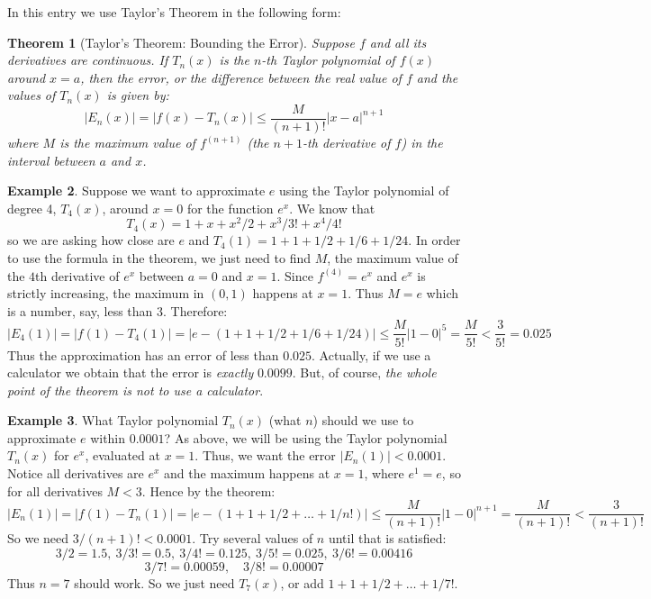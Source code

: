 \documentclass[12pt]{article}
\newtheorem{thm}{Theorem}
\theoremstyle{definition}
\newtheorem{exa}[thm]{Example}
\begin{document}
In this entry we use Taylor's Theorem in the following form:

\begin{thm}[Taylor's Theorem: Bounding the Error] Suppose $f$ and all its derivatives are continuous. If $T_n(x)$ is the $n$-th Taylor polynomial of $f(x)$ around $x=a$, then the error, or the difference between the real value of $f$ and the values of $T_n(x)$ is given by:
$$|E_n(x)|=|f(x)-T_n(x)|\leq \frac{M}{(n+1)!}|x-a|^{n+1}$$
where $M$ is the maximum value of $f^{(n+1)}$ (the $n+1$-th derivative of $f$) in the interval between $a$ and $x$.
\end{thm}

\begin{exa}
Suppose we want to approximate $e$ using the Taylor polynomial of degree 4, $T_4(x)$, around $x=0$ for the function $e^x$. We know that 
$$T_4(x)=1+x+x^2/2+x^3/3!+x^4/4!$$
so we are asking how close are $e$ and $T_4(1)=1+1+1/2+1/6+1/24$. In order to use the formula in the theorem, we just need to find $M$, the maximum value of the $4$th derivative of $e^x$ between $a=0$ and $x=1$. Since $f^{(4)}=e^x$ and $e^x$ is strictly increasing, the maximum in $(0,1)$ happens at $x=1$. Thus $M=e$ which is a number, say, less than $3$. Therefore:
$$|E_4(1)|=|f(1)-T_4(1)|=|e-(1+1+1/2+1/6+1/24)|\leq \frac{M}{5!}|1-0|^5=\frac{M}{5!}<\frac{3}{5!}=0.025$$
Thus the approximation has an error of less than $0.025$. Actually, if we use a calculator we obtain that the error is {\it exactly} $0.0099$. But, of course, {\it the whole point of the theorem is not to use a calculator}.
\end{exa}

\begin{exa}
What Taylor polynomial $T_n(x)$ (what $n$) should we use to approximate $e$ within $0.0001$? As above, we will be using the Taylor polynomial $T_n(x)$ for $e^x$, evaluated at $x=1$. Thus, we want the error $|E_n(1)|<0.0001$. Notice all derivatives are $e^x$ and the maximum happens at $x=1$, where $e^1=e$, so for all derivatives $M<3$. Hence by the theorem: 
$$|E_n(1)|=|f(1)-T_n(1)|=|e-(1+1+1/2+\ldots+1/n!)|\leq \frac{M}{(n+1)!}|1-0|^{n+1}=\frac{M}{(n+1)!}<\frac{3}{(n+1)!}$$
So we need $3/(n+1)! < 0.0001$. Try several values of $n$ until that is satisfied:
$$ 3/2=1.5,\ 3/3!=0.5,\ 3/4!=0.125,\ 3/5!=0.025,\ 3/6! =0.00416$$
$$ 3/7!=0.00059, \quad 3/8!=0.00007$$
Thus $n=7$ should work. So we just need $T_7(x)$, or add $1+1+1/2+\ldots+1/7!$.
\end{exa}
\end{document}
